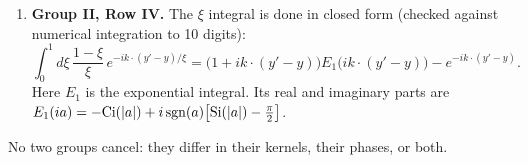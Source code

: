 \documentclass[10pt]{article}
\begin{document}
\begin{enumerate}
\begin{itemize}
\begin{align*}
&=\Big[f^{c'bd'}U^{ac'}(w')\rho^{d'}(x')-f^{ac'd'}U^{c'b}(z)U^{d'e'}(x')\rho^{e'}(x')\Big]\Big[f^{cbd}U^{ac}(w)\rho^{d}(x)-f^{acd}U^{cb}(z)U^{de}(x)\rho^{e}(x)\Big].
\end{align*}
\item The five equations share the phase and the colour factor, so they are added into one kernel. The first two have the same square bracket and combine into $\big[\log\frac{(x-z)^{2}}{(x'-z)^{2}}-\log\frac{(x-w)^{2}}{(x'-w')^{2}}\big]$. The log-free term is written over the same overall factor $1/[(x'-w')^{2}(x-z)^{2}-(x-w)^{2}(x'-z)^{2}]$.
\end{itemize}
\item \textbf{Group II, Row IV.} The $\xi$ integral is done in closed form (checked against numerical integration to 10 digits):
\[
\int_{0}^{1}d\xi\,\frac{1-\xi}{\xi}\,e^{-ik\cdot(y'-y)/\xi}=\big(1+ik\cdot(y'-y)\big)E_{1}\big(ik\cdot(y'-y)\big)-e^{-ik\cdot(y'-y)}.
\]
Here $E_{1}$ is the exponential integral. Its real and imaginary parts are $E_{1}(ia)=-{\rm Ci}(|a|)+i\,{\rm sgn}(a)\big[{\rm Si}(|a|)-\tfrac{\pi}{2}\big]$.
\end{enumerate}
No two groups cancel: they differ in their kernels, their phases, or both.
\end{document}
